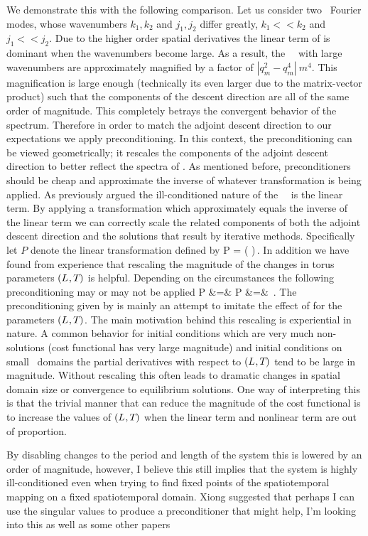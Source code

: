We demonstrate this with the following comparison. Let us consider
two \spt\ Fourier modes, whose {\spt} wavenumbers $k_1,k_2$ and $j_1,j_2$
differ greatly, $k_1 << k_2 $ and $j_1 << j_2$.
Due to the higher order spatial derivatives the
linear term of  is dominant when the wavenumbers become large.
As a result, the \spt\ \Fcs\ with large wavenumbers are approximately
magnified by a factor of $|q_m^2-q_m^4| ~ m^4$.
This magnification is large enough (technically its even larger due to
the matrix-vector product) such that the components
of the descent direction  are all of the same
order of magnitude. This completely betrays the convergent behavior
of the spectrum. Therefore in order to match the adjoint descent direction
to our expectations we apply preconditioning. In this context, the
preconditioning can be viewed geometrically; it rescales the
components of the adjoint descent direction to better reflect
the spectra of \Fcs.
As mentioned before, preconditioners should be cheap and approximate the
inverse of whatever transformation is being applied.
As previously argued the ill-conditioned nature of the \spt\ \KSe\
is the linear term. By applying a transformation which approximately
equals the inverse of the linear term we can correctly scale the
related components of both the adjoint descent direction and the
solutions that result by iterative methods. Specifically let
$P$ denote the linear transformation defined by
\beq \label{e-preconditioner}
P = \Big( \Big)\,.
\eeq
In addition we have found from experience that rescaling the magnitude of
the changes in torus parameters $({L_{}},{T_{}})$ is helpful.
Depending on the circumstances the following preconditioning may or may
not be applied
\bea \label{e-preconditionerTL}
P\cdot \delta \period{} &=& \frac{\delta \period{}}{\period{}} \continue
P\cdot \delta \speriod{} &=& \frac{\delta \speriod{}}{\speriod{}^4}\,.
\eea
The preconditioning given by  is mainly an
attempt to imitate the effect of \refeq{e-preconditioner} for the
parameters $({L_{}},{T_{}})$. The main motivation behind this
rescaling is experiential in nature. A common behavior for initial
conditions which are very much non-solutions (cost functional has very
large magnitude) and initial conditions on small \spt\ domains the
partial derivatives with respect to $({L_{}},{T_{}})$ tend to be
large in magnitude. Without rescaling this often leads to dramatic
changes in spatial domain size or convergence to equilibrium solutions.
One way of interpreting this is that the trivial manner that can reduce
the magnitude of the cost functional is to increase the values of
$({L_{}},{T_{}})$ when the linear term and nonlinear term are out
of proportion.


By disabling changes to the period and length of the system this is lowered by an
order of magnitude, however, I believe this still implies that the system is highly ill-conditioned
even when trying to find fixed points of the spatiotemporal mapping on a fixed spatiotemporal domain.
Xiong suggested that perhaps I can use the singular values to produce a preconditioner that might help,
I'm looking into this as well as some other papers\rf{Meza95}